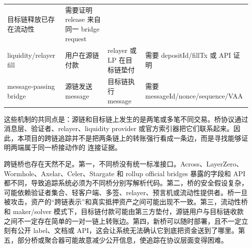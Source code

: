 \documentclass[12pt,a4paper]{ctexart}
\begin{document}
\begin{longtable}[]{@{}llll@{}}
\begin{minipage}[t]{0.22\columnwidth}
目标链释放已存在流动性\strut
\end{minipage} & \begin{minipage}[t]{0.22\columnwidth}\raggedright
需要证明 release 来自同一 bridge request\strut
\end{minipage}\tabularnewline
\begin{minipage}[t]{0.22\columnwidth}\raggedright
liquidity/relayer fill\strut
\end{minipage} & \begin{minipage}[t]{0.22\columnwidth}\raggedright
用户在源链付款\strut
\end{minipage} & \begin{minipage}[t]{0.22\columnwidth}\raggedright
relayer 或 LP 在目标链垫付\strut
\end{minipage} & \begin{minipage}[t]{0.22\columnwidth}\raggedright
需要 depositId/fillTx 或 API 证明\strut
\end{minipage}\tabularnewline
\begin{minipage}[t]{0.22\columnwidth}\raggedright
message-passing bridge\strut
\end{minipage} & \begin{minipage}[t]{0.22\columnwidth}\raggedright
源链发送 message\strut
\end{minipage} & \begin{minipage}[t]{0.22\columnwidth}\raggedright
目标链执行 message\strut
\end{minipage} & \begin{minipage}[t]{0.22\columnwidth}\raggedright
需要 messageId/nonce/sequence/VAA\strut
\end{minipage}\tabularnewline
\bottomrule
\end{longtable}

这些机制的共同点是：源链和目标链上发生的是两笔或多笔不同交易。桥协议通过消息层、验证者、relayer、liquidity
provider
或官方索引器把它们联系起来。因此，本项目的跨链追踪并不是把两条链上的转账强行看成一条边，而是寻找能够证明两端属于同一桥接动作的
连接证据。

跨链桥也存在天然不足。第一，不同桥没有统一标准接口。Across、LayerZero、Wormhole、Axelar、Celer、Stargate
和 rollup official bridges 暴露的字段和 API
都不同，导致追踪系统必须为不同桥分别写解析代码。第二，桥的安全假设复杂，可能依赖验证者集合、轻客户端、多签、relayer、预言机或流动性提供者。桥一旦被攻击，资产的``跨链表示''和真实抵押资产之间可能出现不一致。第三，流动性桥和
maker/solver
模式下，目标链付款可能由第三方垫付，源链用户与目标链收款之间不一定存在简单的一对一链上转账边。第四，新桥可以随时部署，且不一定立刻有公开
label、文档或 API，这会让系统无法确认它到底把资金送到了哪里。第五，部分桥或聚合器可能故意减少公开信息，使追踪在协议层面变得困难。
\end{document}
